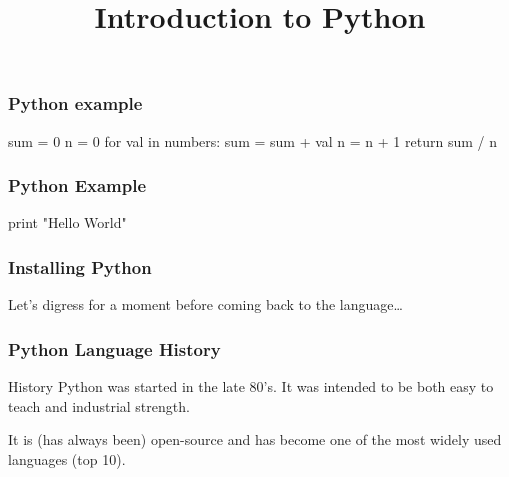 
\title{Introduction to Python}




\begin{frame}[fragile]
\frametitle{Python example}

\begin{python}
sum = 0
n = 0
for val in numbers:
    sum = sum + val
    n = n + 1
return sum / n
\end{python}

\end{frame}

\begin{frame}[fragile]
\frametitle{Python Example}

\begin{python}
print "Hello World"
\end{python}
\end{frame}

\begin{frame}[fragile]
\frametitle{Installing Python}

Let's digress for a moment before coming back to the language\ldots
\end{frame}


\begin{frame}[fragile]
\frametitle{Python Language History}

\begin{block}{History}
Python was started in the late 80's. It was intended to be both \alert{easy to teach} and \alert{industrial strength}.

It is (has always been) open-source and has become one of the most widely used languages (top 10).
\end{block}
\end{frame}

